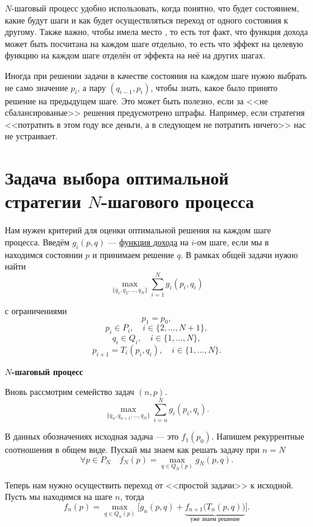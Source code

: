 $N$-шаговый процесс удобно использовать, когда понятно, что будет состоянием, какие будут шаги и как будет осуществляться переход от одного состояния к другому. Также важно, чтобы имела место , то есть тот факт, что функция дохода может быть посчитана на каждом шаге отдельно, то есть что эффект на целевую функцию на каждом шаге отделён от эффекта на неё на других шагах.

\remark

Иногда при решении задачи в качестве состояния на каждом шаге нужно выбрать не само значение $p_i$, а пару $(q_{i-1}, p_i)$, чтобы знать, какое было принято решение на предыдущем шаге. Это может быть полезно, если за <<не сбалансированые>> решения предусмотрено штрафы. Например, если стратегия <<потратить в этом году все деньги, а в следующем не потратить ничего>> нас не устраивает.

\section{Задача выбора оптимальной стратегии $N$-шагового процесса}\label{n_step_opt}

Нам нужен критерий для оценки оптимальной решения на каждом шаге процесса. Введём $g_i(p, q)$ --- \underline{функция дохода} на $i$-ом шаге, если мы в находимся состоянии $p$ и принимаем решение $q$. В рамках общей задачи нужно найти
\[
\max_{\{q_1, q_2, \dots, q_N\}} \sum_{i=1}^{N} g_i(p_i, q_i)
\]

с ограничениями
\[
p_1 = p_0,
\]
\[
p_i \in P_i, \quad i \in \{2, \dots, N+1\},
\]
\[
q_i \in Q_i, \quad i \in \{1, \dots, N\},
\]
\[
p_{i+1} = T_i(p_i, q_i), \quad i \in \{1, \dots, N\}.
\]

\bigskip

\textbf{$N$-шаговый процесс}

Вновь рассмотрим семейство задач $(n, p)$.
\[
\max_{\{q_n, q_{n+1}, \dots, q_N\}} \sum_{i=n}^{N} g_i(p_i, q_i).
\]

В данных обозначениях исходная задача --- это $f_1(p_0)$. Напишем рекуррентные соотношения в общем виде. Пускай мы знаем как решать задачу при $n = N$
\[
\forall p \in P_{N} \quad f_N(p) = \max_{q \in Q_{N}(p)} g_N(p, q).
\]

Теперь нам нужно осуществить переход от <<простой задачи>> к исходной. Пусть мы находимся на шаге $n$, тогда
\[
f_n(p) = \max_{q \in Q_{n}(p)} \Big[g_n(p, q) + \underbrace{f_{n+1}\big(T_{n}(p, q)\big)}_{\text{уже знаем решение}}\Big].
\]

